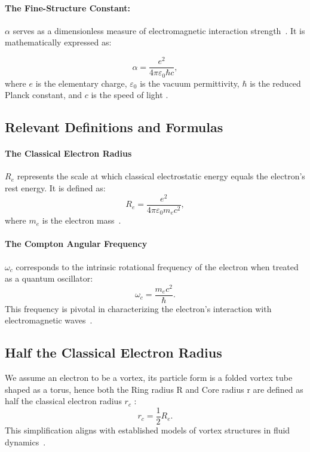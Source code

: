 \documentclass[preprint]{revtex4-2}
\begin{document}
    \paragraph*{The Fine-Structure Constant:}
    $\alpha$ serves as a dimensionless measure of electromagnetic interaction strength~\cite{maxwell1861}.
    It is mathematically expressed as:

    \begin{equation*}
        \alpha = \frac{e^2}{4\pi \varepsilon_0 \hbar c},
    \end{equation*}
    where $e$ is the elementary charge, $\varepsilon_0$ is the vacuum permittivity, $\hbar$ is the reduced Planck constant, and $c$ is the speed of light \cite{dirac1930quantum}.

    \subsection*{Relevant Definitions and Formulas}
    \paragraph*{The Classical Electron Radius}
    $R_e$ represents the scale at which classical electrostatic energy equals the electron's rest energy. It is defined as:
    \begin{equation*}
        R_e = \frac{e^2}{4\pi \varepsilon_0 m_e c^2},
    \end{equation*}
    where $m_e$ is the electron mass~\cite{helmholtz1858}.

    \paragraph*{The Compton Angular Frequency}
    $\omega_c$ corresponds to the intrinsic rotational frequency of the electron when treated as a quantum oscillator:
    \begin{equation*}
        \omega_c = \frac{m_e c^2}{\hbar}.
    \end{equation*}
    This frequency is pivotal in characterizing the electron's interaction with electromagnetic waves~\cite{kelvin1867}.

    \subsection*{Half the Classical Electron Radius}
    We assume an electron to be a vortex, its particle form is a folded vortex tube shaped as a torus, hence both the Ring radius R and Core radius r are defined as half the classical electron radius  $r_c$ :
    \begin{equation*}
        r_c = \frac{1}{2} R_e.
    \end{equation*}
    This simplification aligns with established models of vortex structures in fluid dynamics~\cite{kleckner2013}.
\end{document}
